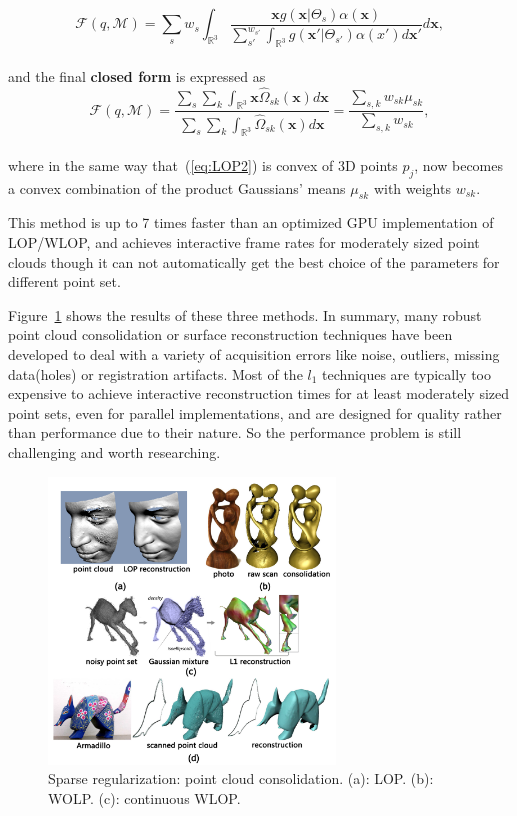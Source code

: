 \small{
\begin{equation}
 \label{eq:CLOP2}
 \mathcal{F}(q,\mathcal{M})=\sum_{s}^{}w_s\int_{\mathbb{R}^3}^{}
 \frac{\mathbf{x}g(\mathbf{x}|\Theta_{s})\alpha(\mathbf{x})}
 {\sum_{s'}^{w_{s'}}\int_{\mathbb{R}^3}^{}g(\mathbf{x'}|\Theta_{s'})\alpha(x')d\mathbf{x}'}
 d\mathbf{x},
\end{equation}
}
\\
and the final \textbf{closed form} is expressed as
\small{
\begin{equation}
 \label{eq:CLOP3}
 \mathcal{F}(q,\mathcal{M})=\frac{\sum_{s}^{}\sum_{k}^{}\int_{\mathbb{R}^3}^{}\mathbf{x}\widehat{\Omega}_{sk}(\mathbf{x})d\mathbf{x}}
 {\sum_{s}^{}\sum_{k}^{}\int_{\mathbb{R}^3}^{}\widehat{\Omega}_{sk}(\mathbf{x})d\mathbf{x}}
 =\frac{\sum_{s,k}^{}w_{sk}\mu_{sk}}
 {\sum_{s,k}^{}w_{sk}},
\end{equation}
}
\\
where in the same way that~(\ref{eq:LOP2}) is convex of 3D points $p_{j}$, now becomes a convex combination of the product Gaussians' means $\mu_{sk}$ with weights $w_{sk}$.

This method is up to 7 times faster than an optimized GPU implementation of LOP/WLOP, and achieves interactive frame rates for moderately sized point clouds though it can not automatically get the best choice of the parameters for different point set.

\vspace{10pt}
Figure~\ref{fig:L1 median consolidation} shows the results of these three methods. In summary, many robust point cloud consolidation or surface reconstruction techniques have been developed to deal with a variety of acquisition errors like noise, outliers, missing data(holes) or registration artifacts.
Most of the $l_1$ techniques are typically too expensive to achieve interactive reconstruction times for at least moderately sized point sets, even for parallel implementations,
and are designed for quality rather than performance due to their nature. So the performance problem is still challenging and worth researching. 

\begin{figure}[ht]
  \centering
  \includegraphics[width=3in]{images/reconstruction_L1}
  \caption{Sparse regularization: point cloud consolidation. (a): LOP\cite{lipman2007parameterization}. (b): WOLP\cite{huang2009consolidation}. (c): continuous WLOP\cite{preiner2014CPF}.}
  \label{fig:L1 median consolidation}
\end{figure}